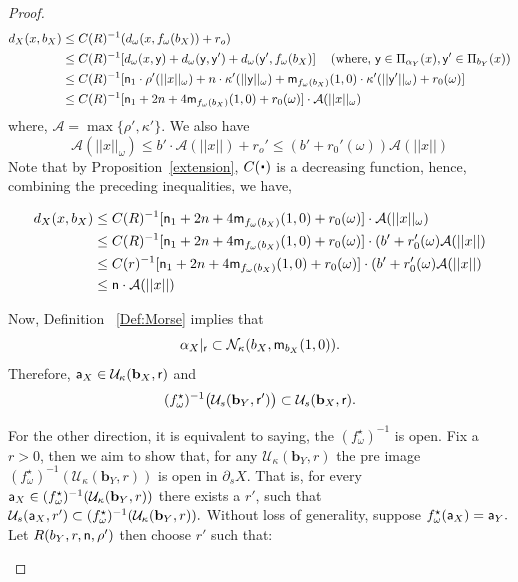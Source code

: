 \documentclass[12 pt]{amsart}
\newcommand{\calA}{\mathcal{A}}
\newcommand{\calN}{\mathcal{N}}
\newcommand{\calU}{\mathcal{U}}
\newcommand{\bfa}{\textbf{a}}
\newcommand{\bfb}{\textbf{b}}
\theoremstyle{definition}
\theoremstyle{remark}
\renewcommand{\bfa}{{\sf a}}
\newcommand{\mm}{{\sf m}}
\newcommand{\nn}{{\sf n}}
\newcommand{\rr}{{\sf r}}
\newcommand{\yy}{{\sf y}}
\newcommand{\param}{{\mathchoice{\mkern1mu\mbox{\raise2.2pt\hbox{$
  \centerdot$}}
  \mkern1mu}{\mkern1mu\mbox{\raise2.2pt\hbox{$\centerdot$}}\mkern1mu}{
  \mkern1.5mu\centerdot\mkern1.5mu}{\mkern1.5mu\centerdot\mkern1.5mu}}}
\begin{document}
\begin{proof}
\begin{align*} 
d_X(x, b_X) 
&\leq C(R)^{-1}(d_\omega(x,f_\omega(b_X))  + r_o)  \\
& \leq C(R)^{-1}[d_\omega(x,\yy)+d_\omega(\yy,\yy')+d_\omega(\yy',f_\omega(b_X)] \text{\hspace{0.3cm} (where, } \yy \in \Pi_{\alpha_Y}(x), \yy' \in \Pi_{b_Y}(x))\\
& \leq C(R)^{-1}[\nn_1 \cdot \rho'(||x||_\omega)+n \cdot \kappa'(||\yy||_\omega)+\mm_{f_\omega(b_X)}(1,0) \cdot \kappa'(||\yy'||_\omega)+r_0(\omega)]\\
& \leq   C(R)^{-1}[\nn_1  +2n+4\mm_{f_\omega(b_X)}(1,0)+r_0(\omega)] \cdot \calA(||x||_\omega)
\end{align*} 
where, $\calA=\max\{\rho',\kappa'\}$.
We also have 
\[
\calA(||x||_\omega) \leq b'\cdot \calA(||x||)+r_o'  \leq (b'+r_0'(\omega)) \calA(||x||)
\]
Note that by Proposition~\ref {extension},  $C(\param)$ is a decreasing function, hence, combining the preceding inequalities, we have,

\begin{align*} 
d_X(x, b_X) & \leq C(R)^{-1}[\nn_1  +2n+4\mm_{f_\omega(b_X)}(1,0)+r_0(\omega)] \cdot \calA(||x||_\omega)\\
& \leq C(R)^{-1}[\nn_1  +2n+4\mm_{f_\omega(b_X)}(1,0)+r_0(\omega)] \cdot (b'+r_0'(\omega) \calA(||x||)\\
& \leq C(r)^{-1}[\nn_1 +2n+4\mm_{f_\omega(b_X)}(1,0)+r_0(\omega)] \cdot (b'+r_0'(\omega) \calA(||x||)\\
& \leq \nn \cdot \calA(||x||)
\end{align*}

Now, Definition ~\ref{Def:Morse} implies that 
\[
\alpha_X|_\rr \subset \calN_\kappa(b_X, \mm_{b_X}(1,0)). 
\]
Therefore, $\bfa_X \in \calU_{\kappa}(\bfb_X, \rr)$ and
\[
(f_\omega^\star)^{-1} \big(\calU_{s}(\bfb_Y, \rr')\big) \subset \calU_{s}(\bfb_X, \rr). 
\]



For the other direction, it is equivalent to saying, the $(f_\omega^\star)^{-1}$ is open. Fix a $r >0$, then we aim to show that, for any  $\calU_\kappa(\bfb_Y,r)$ the pre image $(f_\omega^\star)^{-1}(\calU_\kappa(\bfb_Y,r))$ is open in $\partial_sX$. That is, for every $\bfa_X\in (f_\omega^\star)^{-1}(\calU_\kappa(\bfb_Y,r)) $ there exists a $r'$, such that $\calU_s(\bfa_X,r') \subset (f_\omega^\star)^{-1}(\calU_\kappa(\bfb_Y,r)).$ Without loss of generality, suppose $f_\omega^\star(\bfa_X)=\bfa_Y.$ \newline
Let $R(b_Y,r,\nn, \rho')$ then choose $r'$ such that:
\begin{enumerate}
    

\end{enumerate}
\end{proof}
\end{document}
